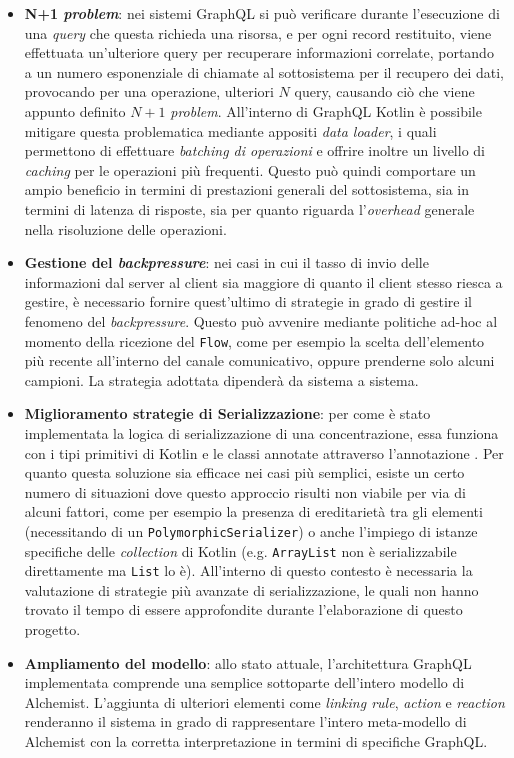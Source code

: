 \begin{itemize}
    \item \textbf{N+1 \textit{problem}}: nei sistemi GraphQL si può verificare durante l'esecuzione di una \textit{query} che questa richieda una risorsa, e per ogni record
        restituito, viene effettuata un'ulteriore query per recuperare informazioni correlate, portando a un numero esponenziale di chiamate al sottosistema per il recupero dei dati,
        provocando per una operazione, ulteriori $N$ query, causando ciò che viene appunto definito $N+1$ \textit{problem}. All'interno di GraphQL Kotlin è possibile mitigare questa
        problematica mediante appositi \textit{data loader}, i quali permettono di effettuare \textit{batching di operazioni} e offrire inoltre un livello di \textit{caching} per le
        operazioni più frequenti. Questo può quindi comportare un ampio beneficio in termini di prestazioni generali del sottosistema, sia in termini di latenza di risposte,
        sia per quanto riguarda l'\textit{overhead} generale nella risoluzione delle operazioni.
    \item \textbf{Gestione del \textit{backpressure}}: nei casi in cui il tasso di invio delle informazioni dal server al client sia maggiore di quanto il client stesso riesca a gestire,
        è necessario fornire quest'ultimo di strategie in grado di gestire il fenomeno del \textit{backpressure}. Questo può avvenire mediante politiche ad-hoc al momento della ricezione
        del \texttt{Flow}, come per esempio la scelta dell'elemento più recente all'interno del canale comunicativo, oppure prenderne solo alcuni campioni. La strategia adottata
        dipenderà da sistema a sistema.
    \item \textbf{Miglioramento strategie di Serializzazione}: per come è stato implementata la logica di serializzazione di una concentrazione, essa funziona con i tipi primitivi di Kotlin
        e le classi annotate attraverso l'annotazione . Per quanto questa soluzione sia efficace nei casi più semplici, esiste un certo numero di situazioni dove
        questo approccio risulti non viabile per via di alcuni fattori, come per esempio la presenza di ereditarietà tra gli elementi (necessitando di un \texttt{PolymorphicSerializer}) o
        anche l'impiego di istanze specifiche delle \textit{collection} di Kotlin (e.g. \texttt{ArrayList} non è serializzabile direttamente ma \texttt{List} lo è). All'interno di questo contesto
        è necessaria la valutazione di strategie più avanzate di serializzazione, le quali non hanno trovato il tempo di essere approfondite durante l'elaborazione di questo progetto.
    \item \textbf{Ampliamento del modello}: allo stato attuale, l'architettura GraphQL implementata comprende una semplice sottoparte dell'intero modello di Alchemist. L'aggiunta di ulteriori
        elementi come \textit{linking rule}, \textit{action} e \textit{reaction} renderanno il sistema in grado di rappresentare l'intero meta-modello di Alchemist con la corretta interpretazione
        in termini di specifiche GraphQL.
\end{itemize}
